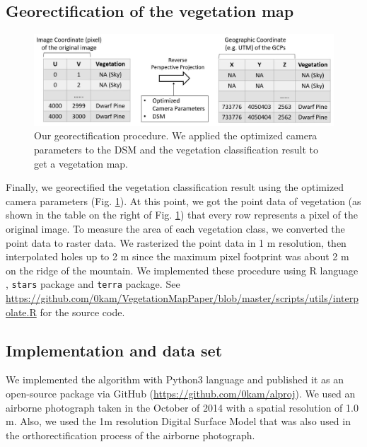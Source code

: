 \documentclass{article}
\begin{document}
\hypertarget{georectification-of-the-vegetation-map}{%
\subsection{Georectification of the vegetation map}\label{georectification-of-the-vegetation-map}}



\begin{figure}
\includegraphics[width=1\linewidth]{paper_files/figures/Slide6} \caption{Our georectification procedure. We applied the optimized camera parameters to the DSM and the vegetation classification result to get a vegetation map.}\label{fig:georec}
\end{figure}

Finally, we georectified the vegetation classification result using the optimized camera parameters (Fig. \ref{fig:georec}). At this point, we got the point data of vegetation (as shown in the table on the right of Fig. \ref{fig:georec}) that every row represents a pixel of the original image. To measure the area of each vegetation class, we converted the point data to raster data. We rasterized the point data in 1 m resolution, then interpolated holes up to 2 m since the maximum pixel footprint was about 2 m on the ridge of the mountain. We implemented these procedure using R language \cite{RCore}, \texttt{stars} package \cite{Rstars} and \texttt{terra} \cite{Rterra} package. See \url{https://github.com/0kam/VegetationMapPaper/blob/master/scripts/utils/interpolate.R} for the source code.

\hypertarget{implementation-and-data-set}{%
\subsection{Implementation and data set}\label{implementation-and-data-set}}

We implemented the algorithm with Python3 language and published it as an open-source package via GitHub (\url{https://github.com/0kam/alproj}). We used an airborne photograph taken in the October of 2014 with a spatial resolution of 1.0 m. Also, we used the 1m resolution Digital Surface Model that was also used in the orthorectification process of the airborne photograph.
\end{document}
